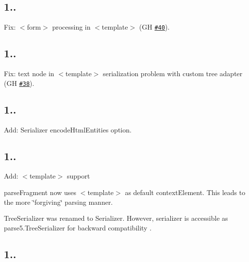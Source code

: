 \subsection*{1..}


\begin{DoxyItemize}
\item Fix\+: {\ttfamily $<$form$>$} processing in {\ttfamily $<$template$>$} (GH \href{https://github.com/inikulin/parse5/issues/40}{\tt \#40}).
\end{DoxyItemize}

\subsection*{1..}


\begin{DoxyItemize}
\item Fix\+: text node in {\ttfamily $<$template$>$} serialization problem with custom tree adapter (GH \href{https://github.com/inikulin/parse5/issues/38}{\tt \#38}).
\end{DoxyItemize}

\subsection*{1..}


\begin{DoxyItemize}
\item Add\+: Serializer {\ttfamily encode\+Html\+Entities} option.
\end{DoxyItemize}

\subsection*{1..}


\begin{DoxyItemize}
\item Add\+: {\ttfamily $<$template$>$} support
\item {\ttfamily parse\+Fragment} now uses {\ttfamily $<$template$>$} as default {\ttfamily context\+Element}. This leads to the more \char`\"{}forgiving\char`\"{} parsing manner.
\item {\ttfamily Tree\+Serializer} was renamed to {\ttfamily Serializer}. However, serializer is accessible as {\ttfamily parse5.\+Tree\+Serializer} for backward compatibility .
\end{DoxyItemize}

\subsection*{1..}


